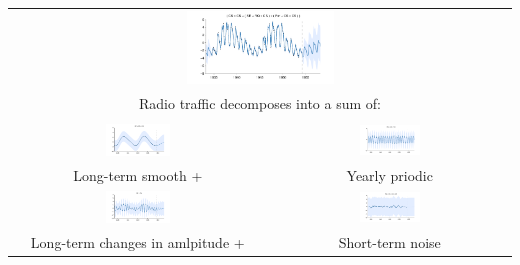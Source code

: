 \documentclass[portrait,a0b,final,a4resizeable]{a0poster}
\newenvironment{poster}{
  \begin{center}
  \begin{minipage}[c]{0.95\textwidth}
}{
  \end{minipage} 
  \end{center}
}
\begin{document}
\begin{poster}
\begin{multicols}{2}
\begin{tabular}{cc}
\multicolumn{2}{c}{\includegraphics[width=0.3\textwidth]{../figures/radio/monthly-critical-radio-frequenci_all.pdf}} \\
\multicolumn{2}{c}{Radio traffic decomposes into a sum of:} \\ \\
\includegraphics[width=0.26\textwidth]{../figures/radio/monthly-critical-radio-frequenci_3.pdf} &
\includegraphics[width=0.26\textwidth]{../figures/radio/monthly-critical-radio-frequenci_4.pdf} \\
Long-term smooth + \quad &
Yearly priodic \\
\includegraphics[width=0.26\textwidth]{../figures/radio/monthly-critical-radio-frequenci_2.pdf} &
\includegraphics[width=0.26\textwidth]{../figures/radio/monthly-critical-radio-frequenci_5.pdf} \\
Long-term changes in amlpitude + \quad &
Short-term noise \quad
\end{tabular}



%  

\vspace{14\baselineskip}



\end{multicols}

\end{poster}
\end{document}
